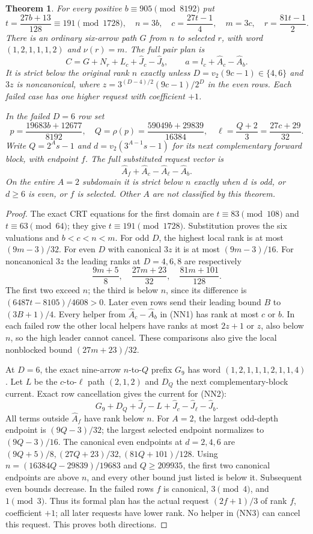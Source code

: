 \documentclass[11pt]{article}
\newtheorem{theorem}{Theorem}
\begin{document}
\begin{theorem}\label{thm:nativenine}
For every positive $b\equiv905\pmod{8192}$ put
\[
 t=\frac{27b+13}{128}\equiv191\pmod{1728},\quad n=3b,
 \quad c=\frac{27t-1}{4},\quad m=3c,\quad r=\frac{81t-1}{2}.
\]
There is an ordinary six-arrow path $G$ from $n$ to selected $r$,
with word $(1,2,1,1,1,2)$ and $\nu(r)=m$.
The full pair plan is
\[
 C=G+N_r+L_c+\widehat J_c-\widehat J_b,\qquad
 a=l_c+\widehat A_c-\widehat A_b.
 \tag{NN1}
\]
It is strict below the original rank $n$ exactly unless
$D=v_2(9c-1)\in\{4,6\}$ and $3z$ is noncanonical, where
$z=3^{(D-4)/2}(9c-1)/2^D$ in the even rows.
Each failed case has one higher request with coefficient $+1$.

In the failed $D=6$ row set
\[
 p=\frac{19683b+12677}{8192},\quad
 Q=\rho(p)=\frac{59049b+29839}{16384},\quad
 \ell=\frac{Q+2}{3}=\frac{27c+29}{32}.
\]
Write $Q=2^As-1$ and $d=v_2(3^{A-1}s-1)$ for its next
complementary forward block, with endpoint $f$.
The full substituted request vector is
\[
 \widehat A_f+\widehat A_c-\widehat A_\ell-\widehat A_b.
 \tag{NN2}
\]
On the entire $A=2$ subdomain it is strict below $n$ exactly when
$d$ is odd, or $d\ge6$ is even, or $f$ is selected.
Other $A$ are not classified by this theorem.
\end{theorem}
\begin{proof}
The exact CRT equations for the first domain are
$t\equiv83\pmod{108}$ and $t\equiv63\pmod{64}$;
they give $t\equiv191\pmod{1728}$. Substitution proves the six
valuations and $b<c<n<m$. For odd $D$, the highest local rank is
at most $(9m-3)/32$. For even $D$ with canonical $3z$ it is at
most $(9m-3)/16$. For noncanonical $3z$ the leading ranks at
$D=4,6,8$ are respectively
\[
 \frac{9m+5}{8},\quad\frac{27m+23}{32},\quad
 \frac{81m+101}{128}.
\]
The first two exceed $n$; the third is below $n$, since its
difference is $(6487t-8105)/4608>0$. Later even rows send their
leading bound $B$ to $(3B+1)/4$. Every helper from
$\widehat A_c-\widehat A_b$ in (NN1) has rank at most $c$ or $b$.
In each failed row the other local helpers have ranks at most
$2z+1$ or $z$, also below $n$, so the high leader cannot cancel.
These comparisons also give the local nonblocked bound
$(27m+23)/32$.

At $D=6$, the exact nine-arrow $n$-to-$Q$ prefix $G_9$ has word
$(1,2,1,1,1,2,1,1,4)$. Let $L$ be the $c$-to-$\ell$ path
$(2,1,2)$ and $D_Q$ the next complementary-block current.
Exact row cancellation gives the current for (NN2):
\[
 G_9+D_Q+\widehat J_f-L+
 \widehat J_c-\widehat J_\ell-\widehat J_b.
 \tag{NN3}
\]
All terms outside $\widehat A_f$ have rank below $n$.
For $A=2$, the largest odd-depth endpoint is $(9Q-3)/32$;
the largest selected endpoint normalizes to $(9Q-3)/16$.
The canonical even endpoints at $d=2,4,6$ are
$(9Q+5)/8,(27Q+23)/32,(81Q+101)/128$.
Using $n=(16384Q-29839)/19683$ and $Q\ge209935$,
the first two canonical endpoints are above $n$, and every other
bound just listed is below it. Subsequent even bounds decrease.
In the failed rows $f$ is canonical, $3\pmod4$, and $1\pmod3$.
Thus its formal plan has the actual request $(2f+1)/3$ of rank
$f$, coefficient $+1$; all later requests have lower rank.
No helper in (NN3) can cancel this request. This proves both directions.
\end{proof}
\end{document}

